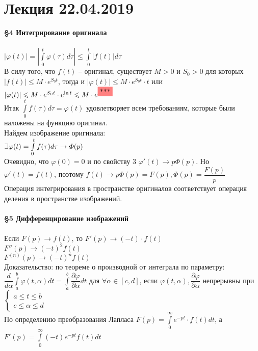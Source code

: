 \documentclass{article}
\numberwithin{equation}{section}
\def\letus{%
    \mathord{\setbox0=\hbox{$\exists$}%
             \hbox{\kern 0.125\wd0%
                   \vbox to \ht0{%
                      \hrule width 0.75\wd0%
                      \vfill%
                      \hrule width 0.75\wd0}%
                   \vrule height \ht0%
                   \kern 0.125\wd0}%
           }%
}
\begin{document}
\section{Лекция 22.04.2019}
\textbf{\large{\S4 Интегрирование оригинала}}
\\\\
$|\varphi(t)|=|\int\limits_0^t\varphi(\tau)d\tau|\leqslant\int\limits_0^t|f(t)|d\tau$\\
В силу того, что $f(t)$ -- оригинал, существует $M>0$ и $S_0>0$ для которых $|f(t)|\leqslant M\cdot e^{S_0t}$, тогда и $|\varphi(t)|\leqslant M\cdot e^{S_0t}\cdot t$ или $|\varphi(t)|\leqslant M\cdot e^{S_0t}\cdot e^{\ln t}\leqslant M\cdot e^{\mbox{\colorbox{red!50}{***}}}$\\
Итак $\int\limits_0^tf(\tau)d\tau=\varphi(t)$ удовлетворяет всем требованиям, которые были наложены на функцию оригинал.\\
Найдем изображение оригинала:\\
$\letus\varphi(t)=\int\limits_0^tf(\tau)d\tau\rightarrow\varPhi(p)$\\
Очевидно, что $\varphi(0)=0$ и по свойству 3 $\varphi'(t)\rightarrow p\varPhi(p)$. Но $\varphi'(t)=f(t)$, поэтому $f(t)\rightarrow p\varPhi(p)=F(p),\varPhi(p)=\dfrac{F(p)}{p}$\\
Операция интегрирования в пространстве оригиналов соответствует операция деления в пространстве изображений.
\\\\
\textbf{\large{\S5 Дифференцирование изображений}}
\\\\
Если $F(p)\rightarrow f(t)$, то $F'(p)\rightarrow(-t)\cdot f(t)$\\
$F''(p)\rightarrow(-t)^2f(t)$\\
$F^{(n)}(p)\rightarrow(-t)^nf(t)$\\
Доказательство: по теореме о производной от интеграла по параметру: $\dfrac{d}{d\alpha}\int\limits_a^b\varphi(t,\alpha)dt=\int\limits_a^b\dfrac{\partial\varphi}{\partial\alpha}dt$ для $\forall\alpha\in[c,d]$, если $\varphi(t,\alpha),\dfrac{\partial\varphi}{\partial\alpha}$ непрерывны при $\begin{cases}
a\leqslant t\leqslant b\\
c\leqslant\alpha\leqslant d
\end{cases}$\\
По определению преобразования Лапласа $F(p)=\int\limits_0^\infty e^{-pt}\cdot f(t)dt$, а $F'(p)=\int\limits_0^\infty(-t)e^{-pt}f(t)dt$\\
\end{document}
